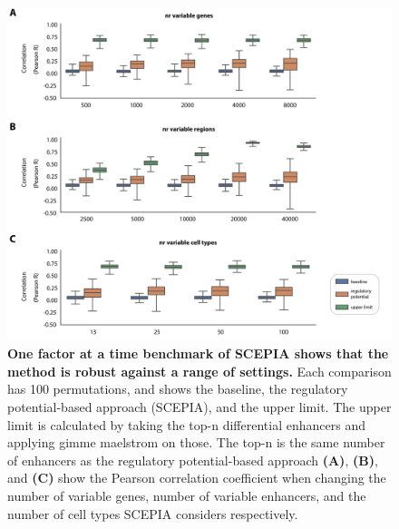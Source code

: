 \begin{figure}
    \centering
    \includegraphics[width=\linewidth]{ch.scepia/imgs/BulkBenchmarks_MvS_Myriad_SuppFig1_centered.png}
    \caption{\textbf{One factor at a time benchmark of SCEPIA shows that the method is robust against a range of settings.} Each comparison has 100 permutations, and shows the baseline, the regulatory potential-based approach (SCEPIA), and the upper limit. The upper limit is calculated by taking the top-n differential enhancers and applying gimme maelstrom on those. The top-n is the same number of enhancers as the regulatory potential-based approach \textbf{(A)}, \textbf{(B)}, and \textbf{(C)} show the Pearson correlation coefficient when changing the number of variable genes, number of variable enhancers, and the number of cell types SCEPIA considers respectively.}
    \label{fig:bulkbenchmark}
\end{figure}

